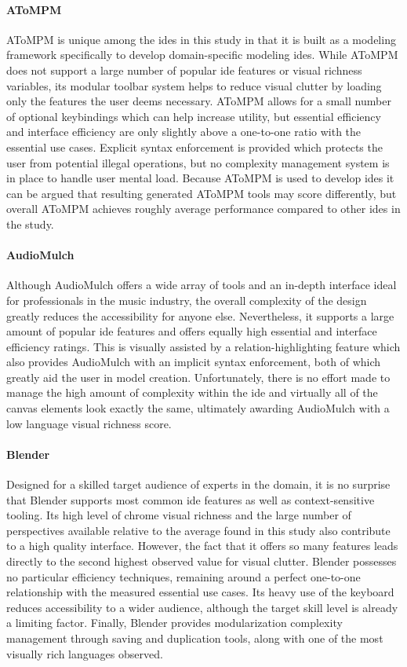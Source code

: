 \paragraph{AToMPM} AToMPM is unique among the \acp{ide} in this study in
that it is built as a modeling framework specifically to develop
domain-specific modeling \acp{ide}. While AToMPM does not support a large
number of popular \ac{ide} features or visual richness variables, its
modular toolbar system helps to reduce visual clutter by loading only the
features the user deems necessary. AToMPM allows for a small number of
optional keybindings which can help increase utility, but essential
efficiency and interface efficiency are only slightly above a one-to-one
ratio with the essential use cases. Explicit syntax enforcement is
provided which protects the user from potential illegal operations, but no
complexity management system is in place to handle user mental load.
Because AToMPM is used to develop \acp{ide} it can be argued that resulting
generated AToMPM tools may score differently, but overall AToMPM achieves
roughly average performance compared to other \acp{ide} in the study.

\paragraph{AudioMulch} Although AudioMulch offers a wide array of tools and
an in-depth interface ideal for professionals in the music industry, the
overall complexity of the design greatly reduces the accessibility for
anyone else. Nevertheless, it supports a large amount of popular \ac{ide}
features and offers equally high essential and interface efficiency
ratings. This is visually assisted by a relation-highlighting feature which
also provides AudioMulch with an implicit syntax enforcement, both of which
greatly aid the user in model creation. Unfortunately, there is no effort
made to manage the high amount of complexity within the \ac{ide} and
virtually all of the canvas elements look exactly the same, ultimately
awarding AudioMulch with a low language visual richness score.

\paragraph{Blender} Designed for a skilled target audience of experts in
the domain, it is no surprise that Blender supports most common \ac{ide}
features as well as context-sensitive tooling. Its high level of chrome
visual richness and the large number of perspectives available relative to
the average found in this study also contribute to a high quality
interface. However, the fact that it offers so many features leads directly
to the second highest observed value for visual clutter. Blender possesses
no particular efficiency techniques, remaining around a perfect one-to-one
relationship with the measured essential use cases. Its heavy use of the
keyboard reduces accessibility to a wider audience, although the target
skill level is already a limiting factor. Finally, Blender provides
modularization complexity management through saving and duplication tools,
along with one of the most visually rich languages observed.

